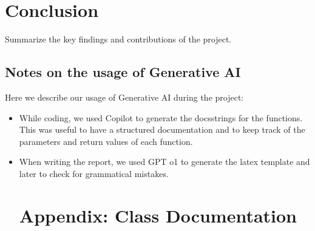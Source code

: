 \documentclass[11pt]{article}
\begin{document}
\section{Conclusion}
Summarize the key findings and contributions of the project.

\subsection{Notes on the usage of Generative AI}

Here we describe our usage of Generative AI during the project: 
\begin{itemize}
    \item While coding, we used Copilot to generate the docsstrings for the functions. This was useful to have a structured documentation and to keep track of the parameters and return values of each function.
    \item When writing the report, we used GPT o1 to generate the latex template and later to check for grammatical mistakes. 

\newpage
\printbibliography

\appendix
\section{Appendix: Class Documentation}

\end{itemize}
\end{document}

